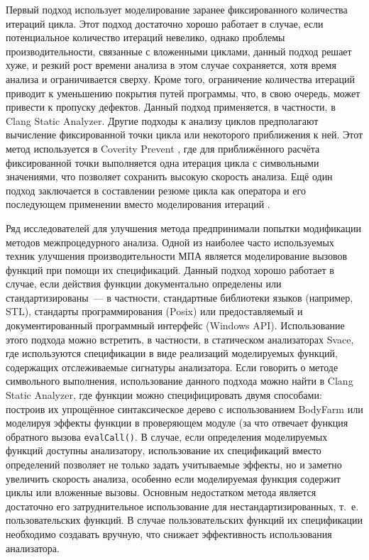 Первый подход использует моделирование заранее фиксированного количества итераций цикла. Этот подход достаточно хорошо работает в случае, если потенциальное количество итераций невелико, однако проблемы производительности, связанные с вложенными циклами, данный подход решает хуже, и резкий рост времени анализа в этом случае сохраняется, хотя время анализа и ограничивается сверху. Кроме того, ограничение количества итераций приводит к уменьшению покрытия путей программы, что, в свою очередь, может привести к пропуску дефектов. Данный подход применяется, в частности, в Clang Static Analyzer. Другие подходы к анализу циклов предполагают вычисление фиксированной точки цикла или некоторого приближения к ней. Этот метод используется в Coverity Prevent \cite{coverity-checker-doc}, где для приближённого расчёта фиксированной точки выполняется одна итерация цикла с символьными значениями, что позволяет сохранить высокую скорость анализа. Ещё один подход заключается в составлении резюме цикла как оператора и его последующем применении вместо моделирования итераций \cite{loopfrog-summary, godefroid-loop-summary}.

Ряд исследователей для улучшения метода предпринимали попытки модификации методов межпроцедурного анализа. Одной из наиболее часто используемых техник улучшения производительности МПА является моделирование вызовов функций при помощи их спецификаций. Данный подход хорошо работает в случае, если действия функции документально определены или стандартизированы~--- в частности, стандартные библиотеки языков (например, STL), стандарты программирования (Posix) или предоставляемый и документированный программный интерфейс (Windows API). Использование этого подхода можно встретить, в частности, в статическом анализаторах Svace, где используются спецификации в виде реализаций моделируемых функций, содержащих отслеживаемые сигнатуры анализатора. Если  говорить о методе символьного выполнения, использование данного подхода можно найти в Clang Static Analyzer, где функции можно специфицировать двумя способами: построив их упрощённое синтаксическое дерево с использованием BodyFarm или моделируя эффекты функции в проверяющем модуле (за что отвечает функция обратного вызова \texttt{evalCall()}. В случае, если определения моделируемых функций доступны анализатору, использование их спецификаций вместо определений позволяет не только задать учитываемые эффекты, но и заметно увеличить скорость анализа, особенно если моделируемая функция содержит циклы или вложенные вызовы. Основным недостатком метода является достаточно его затруднительное использование для нестандартизированных, т.~е. пользовательских функций. В случае пользовательских функций их спецификации необходимо создавать вручную, что снижает эффективность использования анализатора.

